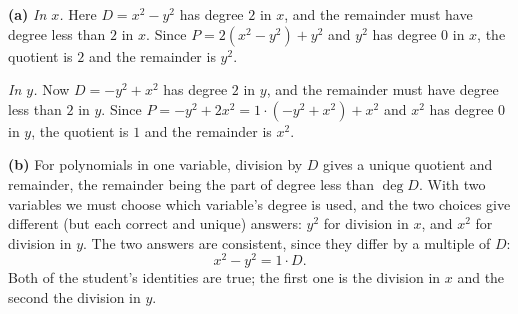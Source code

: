 \textbf{(a)} \emph{In $x$.} Here $D=x^2-y^2$ has degree $2$ in $x$, and the remainder must have degree less than $2$ in $x$. Since $P=2(x^2-y^2)+y^2$ and $y^2$ has degree $0$ in $x$, the quotient is $2$ and the remainder is $\boxed{y^2}$.

\emph{In $y$.} Now $D=-y^2+x^2$ has degree $2$ in $y$, and the remainder must have degree less than $2$ in $y$. Since $P=-y^2+2x^2=1\cdot(-y^2+x^2)+x^2$ and $x^2$ has degree $0$ in $y$, the quotient is $1$ and the remainder is $\boxed{x^2}$.

\textbf{(b)} For polynomials in one variable, division by $D$ gives a unique quotient and remainder, the remainder being the part of degree less than $\deg D$. With two variables we must choose which variable's degree is used, and the two choices give different (but each correct and unique) answers: $y^2$ for division in $x$, and $x^2$ for division in $y$. The two answers are consistent, since they differ by a multiple of $D$:
\[
x^2-y^2=1\cdot D .
\]
Both of the student's identities are true; the first one is the division in $x$ and the second the division in $y$.
